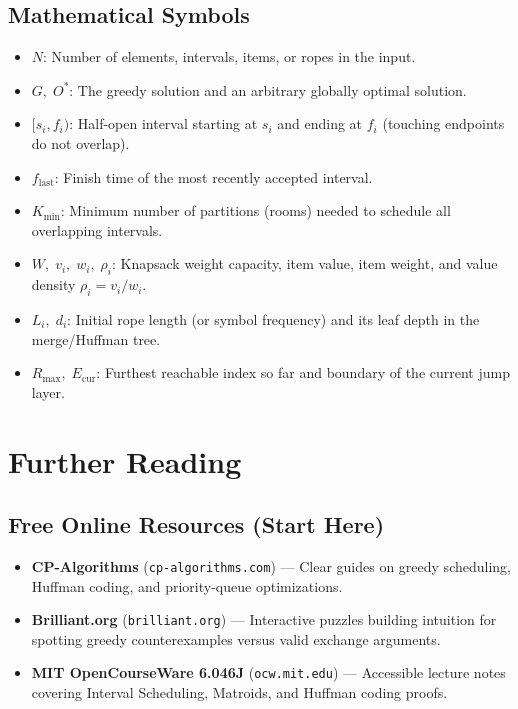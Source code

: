 \documentclass[11pt,a4paper]{article}
\theoremstyle{definition}
\begin{document}
\subsection*{Mathematical Symbols}
\begin{itemize}
    \item $N$: Number of elements, intervals, items, or ropes in the input.
    \item $G,\; O^*$: The greedy solution and an arbitrary globally optimal solution.
    \item $[s_i, f_i)$: Half-open interval starting at $s_i$ and ending at $f_i$ (touching endpoints do not overlap).
    \item $f_{\text{last}}$: Finish time of the most recently accepted interval.
    \item $K_{\min}$: Minimum number of partitions (rooms) needed to schedule all overlapping intervals.
    \item $W,\; v_i,\; w_i,\; \rho_i$: Knapsack weight capacity, item value, item weight, and value density $\rho_i = v_i / w_i$.
    \item $L_i,\; d_i$: Initial rope length (or symbol frequency) and its leaf depth in the merge/Huffman tree.
    \item $R_{\max},\; E_{\text{cur}}$: Furthest reachable index so far and boundary of the current jump layer.
\end{itemize}

\section{Further Reading}

\subsection*{Free Online Resources (Start Here)}
\begin{itemize}
    \item \textbf{CP-Algorithms} (\texttt{cp-algorithms.com}) --- Clear guides on greedy scheduling, Huffman coding, and priority-queue optimizations.
    \item \textbf{Brilliant.org} (\texttt{brilliant.org}) --- Interactive puzzles building intuition for spotting greedy counterexamples versus valid exchange arguments.
    \item \textbf{MIT OpenCourseWare 6.046J} (\texttt{ocw.mit.edu}) --- Accessible lecture notes covering Interval Scheduling, Matroids, and Huffman coding proofs.
\end{itemize}
\end{document}
